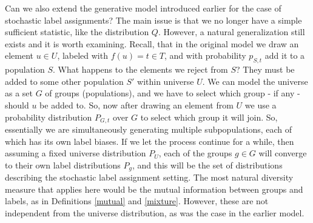\documentclass{article} %
\begin{document}
Can we also extend the generative model introduced earlier for the
case of stochastic label assignments? The main issue is that we no
longer have a simple sufficient statistic, like the distribution
$Q$. However, a natural generalization still exists and it is worth
examining. Recall, that in the original model we draw an element $u\in
U$, labeled with $f(u)=t\in T$, and with probability $p_{S,t}$ add it
to a population $S$. What happens to the elements we reject from $S$?
They must be added to some other population $S'$ within universe $U$. 
We can model the universe as a set $G$ of
groups (populations), and we have to select which group - if any - should $u$ be
added to. So, now after drawing an element from $U$ we use a
probability distribution $P_{G,t}$ over $G$ to select which group it
will join. So, essentially we are simultaneously
generating multiple subpopulations, each of which has its own label
biases. If we let the process continue for a while, then assuming a
fixed universe distribution $P_U$, each of the groups $g\in G$ will
converge to their own label distributions $P_g$, and this will be the
set of distributions describing the stochastic label assignment
setting. The most natural diversity measure that applies here would be
the mutual information between groups and labels, as in Definitions
\ref{mutual} and \ref{mixture}. However, these are not independent
from the universe distribution, as was the case in the earlier model.
\end{document}
